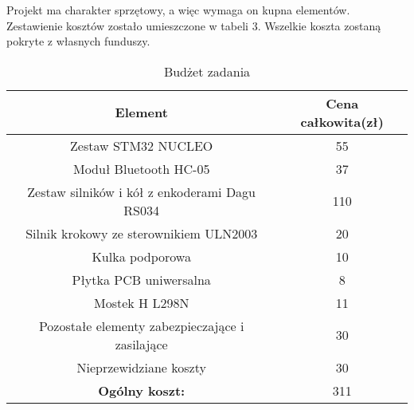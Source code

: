 Projekt ma charakter sprzętowy, a więc wymaga on kupna elementów. Zestawienie kosztów zostało umieszczone w tabeli 3. Wszelkie koszta zostaną pokryte z własnych funduszy.


\begin{table}[!htbp]
\begin{center}
\begin{tabular}{|c|c|}
\hline
\textbf{Element} & \textbf{Cena całkowita(zł)} \\ \hline\hline
Zestaw STM32 NUCLEO & 55 \\ \hline
Moduł Bluetooth HC-05 & 37 \\ \hline
Zestaw silników i kół z enkoderami Dagu RS034 & 110 \\ \hline
Silnik krokowy ze sterownikiem ULN2003 & 20 \\ \hline
Kulka podporowa & 10 \\ \hline
Płytka PCB uniwersalna & 8 \\ \hline
Mostek H L298N & 11 \\ \hline
Pozostałe elementy zabezpieczające i zasilające & 30 \\ \hline
Nieprzewidziane koszty & 30 \\ \hline\hline
\textbf{Ogólny koszt:} & 311 \\ \hline

\end{tabular}
\caption{Budżet zadania}
\end{center}
\end{table}

